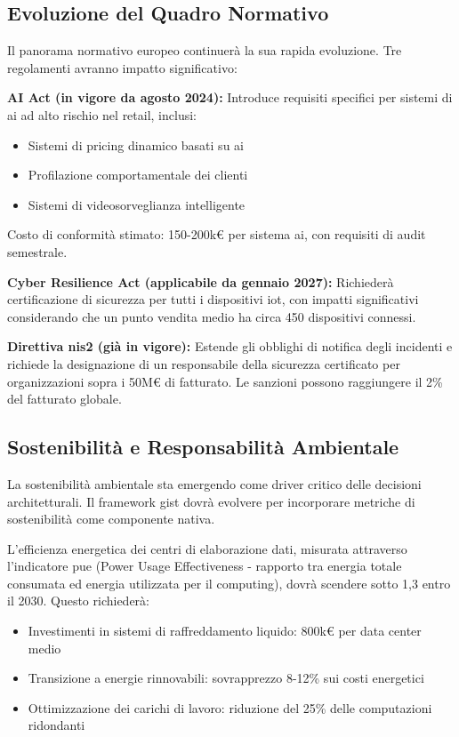 \subsection{\texorpdfstring{Evoluzione del Quadro Normativo}{5.5.2 - Evoluzione del Quadro Normativo}}
\label{subsec:5.5.2}

Il panorama normativo europeo continuerà la sua rapida evoluzione. Tre regolamenti avranno impatto significativo:

\textbf{AI Act (in vigore da agosto 2024):} Introduce requisiti specifici per sistemi di \gls{ai} ad alto rischio nel retail, inclusi:
\begin{itemize}
\item Sistemi di pricing dinamico basati su \gls{ai}
\item Profilazione comportamentale dei clienti
\item Sistemi di videosorveglianza intelligente
\end{itemize}

Costo di conformità stimato: 150-200k€ per sistema \gls{ai}, con requisiti di audit semestrale.

\textbf{Cyber Resilience Act (applicabile da gennaio 2027):} Richiederà certificazione di sicurezza per tutti i dispositivi \gls{iot}, con impatti significativi considerando che un punto vendita medio ha circa 450 dispositivi connessi.

\textbf{Direttiva \gls{nis2} (già in vigore):} Estende gli obblighi di notifica degli incidenti e richiede la designazione di un responsabile della sicurezza certificato per organizzazioni sopra i 50M€ di fatturato. Le sanzioni possono raggiungere il 2\% del fatturato globale.

\subsection{\texorpdfstring{Sostenibilità e Responsabilità Ambientale}{5.5.3 - Sostenibilità e Responsabilità Ambientale}}
\label{subsec:5.5.3}

La sostenibilità ambientale sta emergendo come driver critico delle decisioni architetturali. Il framework \gls{gist} dovrà evolvere per incorporare metriche di sostenibilità come componente nativa.

L'efficienza energetica dei centri di elaborazione dati, misurata attraverso l'indicatore \gls{pue} (Power Usage Effectiveness - rapporto tra energia totale consumata ed energia utilizzata per il computing), dovrà scendere sotto 1,3 entro il 2030. Questo richiederà:
\begin{itemize}
\item Investimenti in sistemi di raffreddamento liquido: 800k€ per data center medio
\item Transizione a energie rinnovabili: sovrapprezzo 8-12\% sui costi energetici
\item Ottimizzazione dei carichi di lavoro: riduzione del 25\% delle computazioni ridondanti
\end{itemize}

